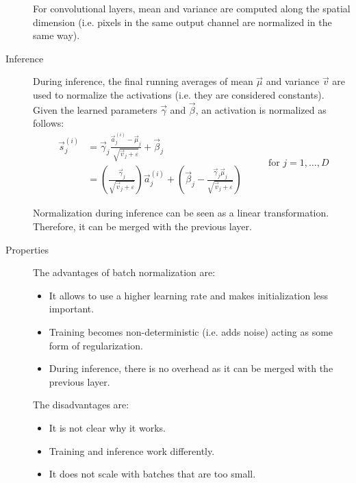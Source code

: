 \begin{description}
        \begin{remark}
            For convolutional layers, mean and variance are computed along the spatial dimension (i.e. pixels in the same output channel are normalized in the same way).
        \end{remark}


    \item[Inference] 
        During inference, the final running averages of mean $\vec{\mu}$ and variance $\vec{v}$ are used to normalize the activations (i.e. they are considered constants).
        Given the learned parameters $\vec{\gamma}$ and $\vec{\beta}$, an activation is normalized as follows:
        \[  
            \begin{split}
                \vec{s}_j^{(i)} &= \vec{\gamma}_j \frac{\vec{a}_j^{(i)} - \vec{\mu}_j}{\sqrt{\vec{v}_j + \varepsilon}} + \vec{\beta}_j \\
                &= \left( \frac{\vec{\gamma}_j}{\sqrt{\vec{v}_j + \varepsilon}} \right) \vec{a}_j^{(i)} + 
                    \left( \vec{\beta}_j - \frac{\vec{\gamma}_j \vec{\mu}_j}{\sqrt{\vec{v}_j + \varepsilon}} \right)
            \end{split}
            \hspace{2em} \text{ for $j = 1, \dots, D$} 
        \]
        
        \begin{remark}
            Normalization during inference can be seen as a linear transformation. Therefore, it can be merged with the previous layer.
        \end{remark}


    \item[Properties]
        The advantages of batch normalization are:
        \begin{itemize}
            \item It allows to use a higher learning rate and makes initialization less important.
            \item Training becomes non-deterministic (i.e. adds noise) acting as some form of regularization.
            \item During inference, there is no overhead as it can be merged with the previous layer.
        \end{itemize}
        The disadvantages are:
        \begin{itemize}
            \item It is not clear why it works.
            \item Training and inference work differently.
            \item It does not scale with batches that are too small.
        \end{itemize}


\end{description}
